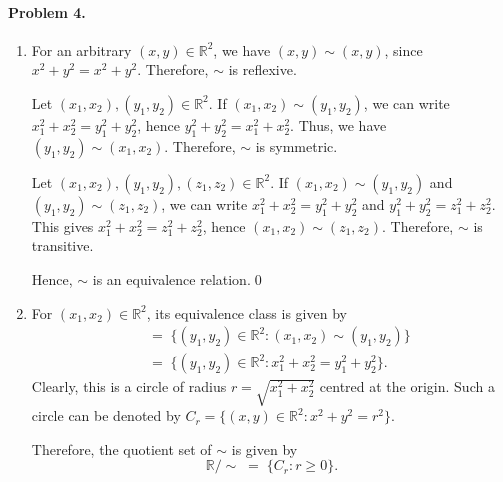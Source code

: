 \documentclass[10pt]{article}
\begin{document}
    \paragraph{Problem 4.}
    \begin{enumerate}
        \item For an arbitrary $(x, y) \in \mathbb{R}^2$, we have $(x,
        y)\sim(x, y)$, since $x^2 + y^2 = x^2 + y^2$. Therefore, $\sim$ is
        reflexive.

        Let $(x_1, x_2), (y_1, y_2) \in \mathbb{R}^2$. If $(x_1, x_2)\sim(y_1,
        y_2)$, we can write $x_1^2 + x_2^2 = y_1^2 + y_2^2$, hence $y_1^2 +
        y_2^2 = x_1^2 + x_2^2$. Thus, we have $(y_1, y_2)\sim(x_1, x_2)$.
        Therefore, $\sim$ is symmetric.

        Let $(x_1, x_2), (y_1, y_2), (z_1, z_2) \in \mathbb{R}^2$. If $(x_1,
        x_2)\sim(y_1, y_2)$ and $(y_1, y_2)\sim(z_1, z_2)$, we can write
        $x_1^2 + x_2^2 = y_1^2 + y_2^2$ and $y_1^2 + y_2^2 = z_1^2 + z_2^2$.
        This gives $x_1^2 + x_2^2 = z_1^2 + z_2^2$, hence $(x_1, x_2)\sim(z_1,
        z_2)$. Therefore, $\sim$ is transitive.

        Hence, $\sim$ is an equivalence relation.\qed

        \item For $(x_1, x_2) \in \mathbb{R}^2$, its equivalence class is
        given by \begin{align*}
            [(x_1, x_2)]
                \;&=\; \{(y_1, y_2) \in \mathbb{R}^2 : (x_1, x_2)\sim(y_1, y_2)\} \\
                \;&=\; \{(y_1, y_2) \in \mathbb{R}^2 : x_1^2 + x_2^2 = y_1^2 + y_2^2\}.
        \end{align*}
        Clearly, this is a circle of radius $r = \sqrt{x_1^2 + x_2^2}$ centred
        at the origin. Such a circle can be denoted by $C_r = \{(x, y) \in
        \mathbb{R}^2 : x^2 + y^2 = r^2\}$.

        Therefore, the quotient set of $\sim$ is given by \[
            \mathbb{R}/\sim \;=\; \{C_r : r \geq 0\}.
        \]

        \begin{center}
        \end{center}
    \end{enumerate}
\end{document}
